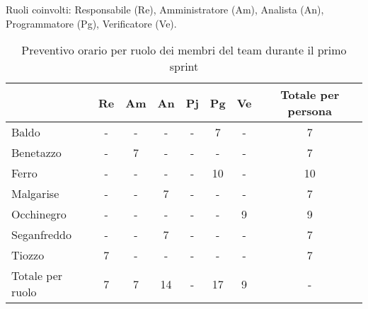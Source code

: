 \newpage
{}
Ruoli coinvolti: Responsabile (Re), Amministratore (Am), Analista (An), Programmatore (Pg), Verificatore (Ve).
\begin{table}[!h]
    \centering
    \begin{tabular}{ | l | c | c | c | c | c | c | c | }
        \hline
        \textbf{} & \textbf{Re} & \textbf{Am} &\textbf{An} & \textbf{Pj} & \textbf{Pg} & \textbf{Ve} & \textbf{Totale per persona} \\
        \hline
        Baldo            &  -   &  -   &  -   &  -   &  7   &  -   &  7   \\
        Benetazzo        &  -   &  7   &  -   &  -   &  -   &  -   &  7   \\
        Ferro            &  -   &  -   &  -   &  -   & 10   &  -   & 10   \\
        Malgarise        &  -   &  -   &  7   &  -   &  -   &  -   &  7   \\
        Occhinegro       &  -   &  -   &  -   &  -   &  -   &  9   &  9   \\
        Seganfreddo      &  -   &  -   &  7   &  -   &  -   &  -   &  7   \\
        Tiozzo           &  7   &  -   &  -   &  -   &  -   &  -   &  7   \\
        \hline
        Totale per ruolo &  7   &  7   & 14   &  -   & 17   &  9   &  -   \\
        \hline
    \end{tabular}
    \caption{Preventivo orario per ruolo dei membri del team durante il primo sprint}
    \label{tab:13}
\end{table}

